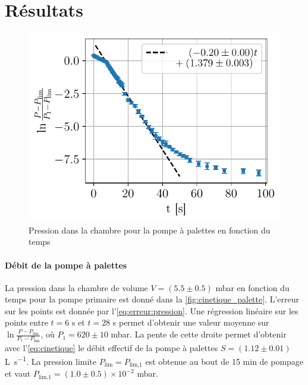 \section{Résultats}

\begin{minipage}{\textwidth}
    \begin{figure}
        \centering
        \includegraphics[width=\linewidth]{figures/cinetique_palettes.pdf}
        \caption{Pression dans la chambre pour la pompe à palettes en fonction du temps}
        \label{fig:cinetique_palette}
    \end{figure}
    
    \paragraph*{Débit de la pompe à palettes}
    La pression dans la chambre de volume \(V = (5.5 \pm 0.5)\) \si{\milli\bar} en fonction du temps pour la pompe primaire est donné dans la \autoref{fig:cinetique_palette}. L'erreur sur les points est donnée par l'\autoref{eq:erreur:pression}. Une régression linéaire sur les points entre \(t = 6\) \si{\second} et \(t = 28\) \si{\second} permet d'obtenir une valeur moyenne sur \(\ln{\frac{P - P_\textrm{lim}}{P_1 - P_\textrm{lim}}}\), où \(P_1 = 620 \pm 10\) \si{\milli\bar}. La pente de cette droite permet d'obtenir avec l'\autoref{eq:cinetique} le débit effectif de la pompe à palettes \(S = (1.12 \pm 0.01)\) \si{\liter \per \second}. La pression limite \(P_\textrm{lim} = P_\textrm{lim,1}\) est obtenue au bout de 15 \si{\minute} de pompage et vaut \(P_\textrm{lim,1} = (1.0 \pm 0.5) \times 10^{-2}\) \si{\milli\bar}.
\end{minipage}

